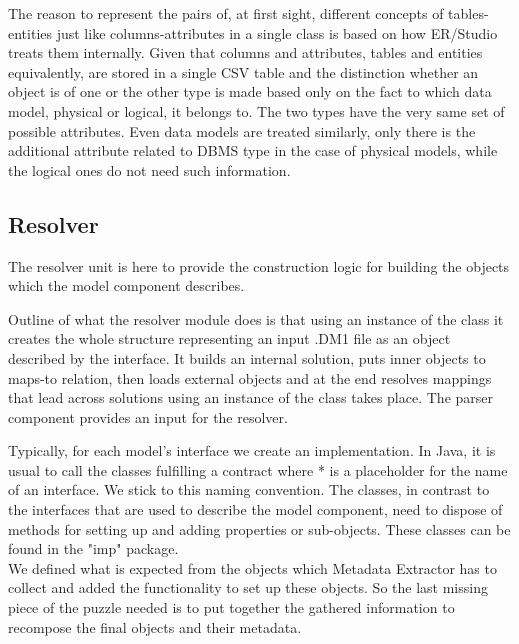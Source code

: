 The reason to represent the pairs of, at first sight, different concepts of tables-entities just like columns-attributes in a single class is based on how ER/Studio treats them internally. Given that columns and attributes, tables and entities equivalently, are stored in a single CSV table and the distinction whether an object is of one or the other type is made based only on the fact to which data model, physical or logical, it belongs to.
The two types have the very same set of possible attributes. 
Even data models are treated similarly, only there is the additional attribute related to DBMS type in the case of physical models, while the logical ones do not need such information.

\subsection{Resolver}

The resolver unit is here to provide the construction logic for building the objects which the model component describes.

Outline of what the resolver module does is that using an instance of the  class it creates the whole structure representing an input .DM1 file as an object described by the  interface. 
It builds an internal solution, puts inner objects to maps-to relation, then loads external objects and at the end resolves mappings that lead across solutions using an instance of the  class takes place.
The parser component provides an input for the resolver.

Typically, for each model's interface we create an implementation. 
In Java, it is usual to call the classes fulfilling a contract  where * is a placeholder for the name of an interface. We stick to this naming convention. 
The  classes, in contrast to the interfaces that are used to describe the model component, need to dispose of methods for setting up and adding properties or sub-objects. These classes can be found in the "imp" package. \\

We defined what is expected from the objects which Metadata Extractor has to collect and added the functionality to set up these objects.
So the last missing piece of the puzzle needed is to put together the gathered information to recompose the final objects and their metadata.

